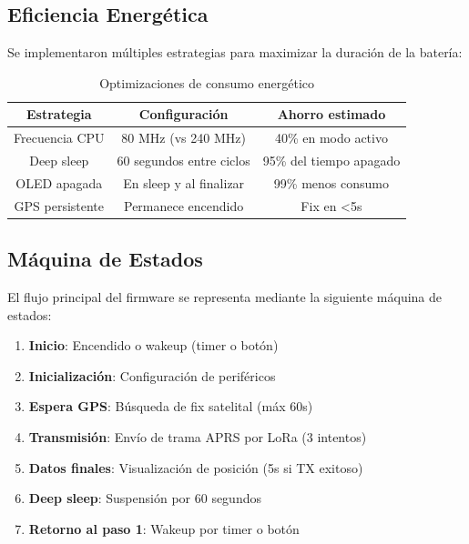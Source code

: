 \documentclass[conference]{IEEEtran}
\begin{document}
\subsection{Eficiencia Energética}

Se implementaron múltiples estrategias para maximizar la duración de la batería:

\begin{table}[H]
    \centering
    \caption{Optimizaciones de consumo energético}
    \begin{tabular}{|c|c|c|}
        \hline
        \textbf{Estrategia} & \textbf{Configuración} & \textbf{Ahorro estimado} \\
        \hline
        Frecuencia CPU & 80 MHz (vs 240 MHz) & 40\% en modo activo \\
        Deep sleep & 60 segundos entre ciclos & 95\% del tiempo apagado \\
        OLED apagada & En sleep y al finalizar & 99\% menos consumo \\
        GPS persistente & Permanece encendido & Fix en \textless 5s \\
        \hline
    \end{tabular}
    
    \label{tab:energia}
\end{table}

\subsection{Máquina de Estados}

El flujo principal del firmware se representa mediante la siguiente máquina de estados:

\begin{enumerate}
    \item \textbf{Inicio}: Encendido o wakeup (timer o botón)
    \item \textbf{Inicialización}: Configuración de periféricos
    \item \textbf{Espera GPS}: Búsqueda de fix satelital (máx 60s)
    \item \textbf{Transmisión}: Envío de trama APRS por LoRa (3 intentos)
    \item \textbf{Datos finales}: Visualización de posición (5s si TX exitoso)
    \item \textbf{Deep sleep}: Suspensión por 60 segundos
    \item \textbf{Retorno al paso 1}: Wakeup por timer o botón
\end{enumerate}
\end{document}
